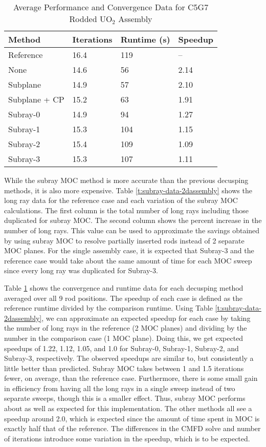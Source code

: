 \begin{table}[h]
    \centering
    \caption{Average Performance and Convergence Data for C5G7 Rodded UO\texorpdfstring{$_2$}{2} Assembly}\label{t:subray-performance-2dassembly}
    \begin{tabular}{l l l l}\toprule
        Method & Iterations & Runtime (s) & Speedup \\\midrule
Reference     & 16.4 & 119 & --   \\
None          & 14.6 & 56 & 2.14 \\
Subplane      & 14.9 & 57 & 2.10 \\
Subplane + CP & 15.2 & 63 & 1.91 \\
Subray-0      & 14.9 & 94 & 1.27  \\
Subray-1      & 15.3 & 104 & 1.15 \\ 
Subray-2      & 15.4 & 109 & 1.09 \\ 
Subray-3      & 15.3 & 107 & 1.11 \\ 
        \bottomrule
    \end{tabular}
\end{table}

While the subray MOC method is more accurate than the previous decusping methods, it is also more expensive.  Table \ref{t:subray-data-2dassembly} shows the long ray data for the reference case and each variation of the subray MOC calculations.  The first column is the total number of long rays including those duplicated for subray MOC.  The second column shows the percent increase in the number of long rays.  This value can be used to approximate the savings obtained by using subray MOC to resolve partially inserted rods instead of 2 separate MOC planes.  For the single assembly case, it is expected that Subray-3 and the reference case would take about the same amount of time for each MOC sweep since every long ray was duplicated for Subray-3.

Table \ref{t:subray-performance-2dassembly} shows the convergence and runtime data for each decusping method averaged over all 9 rod positions. The speedup of each case is defined as the reference runtime divided by the comparison runtime.  Using Table \ref{t:subray-data-2dassembly}, we can approximate an expected speedup for each case by taking the number of long rays in the reference (2 MOC planes) and dividing by the number in the comparison case (1 MOC plane).  Doing this, we get expected speedups of 1.22, 1.12, 1.05, and 1.0 for Subray-0, Subray-1, Subray-2, and Subray-3, respectively.  The observed speedups are similar to, but consistently a little better than predicted.  Subray MOC takes between 1 and 1.5 iterations fewer, on average, than the reference case.  Furthermore, there is some small gain in efficiency from having all the long rays in a single sweep instead of two separate sweeps, though this is a smaller effect.  Thus, subray MOC performs about as well as expected for this implementation.  The other methods all see a speedup around 2.0, which is expected since the amount of time spent in MOC is exactly half that of the reference.  The differences in the CMFD solve and number of iterations introduce some variation in the speedup, which is to be expected.

